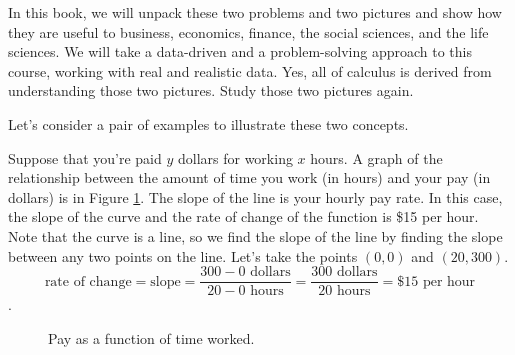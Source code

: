 In this book, we will unpack these two problems and two pictures and show how they are useful to business, economics, finance, the social sciences, and the life sciences. We will take a data-driven and a problem-solving approach to this course, working with real and realistic data. Yes, all of calculus is derived from understanding those two pictures. Study those two pictures again.

Let's consider a pair of examples to illustrate these two concepts.

\begin{example}

Suppose that you're paid $y$ dollars for working $x$ hours. A graph of the relationship between the amount of time you work (in hours) and your pay (in dollars) is in Figure \ref{fig:0-rate}. The slope of the line is your hourly pay rate. In this case, the slope of the curve and the rate of change of the function is \$15 per hour. Note that the curve is a line, so we find the slope of the line by finding the slope between any two points on the line. Let's take the points $(0,0)$ and $(20,300)$.
$$\mbox{rate of change} = \mbox{slope} = \frac{300 - 0\mbox{ dollars}}{20 - 0\mbox{ hours}} = \frac{300 \mbox{ dollars}}{20\mbox{ hours}} = \$15 \mbox{ per hour}$$.
\begin{figure}[ht!]
\centering
{}
\caption{Pay as a function of time worked.}
\label{fig:0-rate}
\end{figure}


\end{example}

